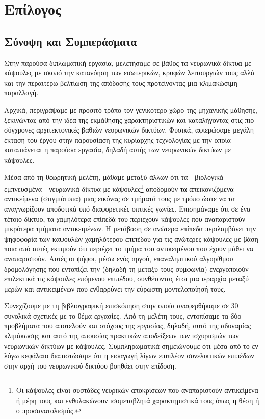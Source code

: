 \chapter{Επίλογος}

\section{Σύνοψη και Συμπεράσματα}

Στην παρούσα διπλωματική εργασία, μελετήσαμε σε βάθος τα νευρωνικά δίκτυα με κάψουλες με σκοπό την κατανόηση των εσωτερικών, κρυφών λειτουργιών τους αλλά και την περαιτέρω βελτίωση της απόδοσής τους προτείνοντας μια κλιμακώσιμη παραλλαγή.\par

Αρχικά, περιγράψαμε με προσιτό τρόπο τον γενικότερο χώρο της μηχανικής μάθησης, ξεκινώντας από την ιδέα της εκμάθησης χαρακτηριστικών και καταλήγοντας στις πιο σύγχρονες αρχιτεκτονικές βαθιών νευρωνικών δικτύων. Φυσικά, αφιερώσαμε μεγάλη έκταση του έργου στην παρουσίαση της κυρίαρχης τεχνολογίας με την οποία καταπιάνεται η παρούσα εργασία, δηλαδή αυτής των νευρωνικών δικτύων με κάψουλες.\par

Μέσα από τη θεωρητική μελέτη, μάθαμε μεταξύ άλλων ότι τα - βιολογικά εμπνευσμένα - νευρωνικά δίκτυα με κάψουλες\footnote{Οι κάψουλες είναι συστάδες νευρικών αποκρίσεων που αναπαριστούν αντικείμενα ή μέρη τους και ενθυλακώνουν ισομεταβλητά χαρακτηριστικά τους όπως η θέση ή ο προσανατολισμός.} αποδομούν τα απεικονιζόμενα αντικείμενα (στιγμιότυπα) μιας εικόνας σε τμήματά τους με τρόπο ώστε να τα αναγνωρίζουν αποδοτικά υπό διαφορετικές οπτικές γωνίες. Επισημάναμε ότι σε ένα τέτοιο δίκτυο, τα χαμηλότερα επίπεδά του περιέχουν κάψουλες που αναπαριστούν μικρότερα τμήματα αντικειμένων. Η μετάβαση σε ανώτερα επίπεδα περιλαμβάνει την ψηφοφορία των καψουλών χαμηλότερου επιπέδου για τις ανώτερες κάψουλες με βάση ποια από αυτές εκτιμούν ότι περιέχει το τμήμα του αντικειμένου που έχουν μάθει να αναπαριστούν. Αυτές οι ψήφοι, μέσω ενός αργού, επαναληπτικού αλγορίθμου δρομολόγησης που εντοπίζει την  (δηλαδή τη μεταξύ τους συμφωνία) ενεργοποιούν επιλεκτικά τις κάψουλες επόμενου επιπέδου, συνθέτοντας έτσι μια ιεραρχία μεταξύ μερών και αντικειμένων που ενθαρρύνει την εύρωστη μοντελοποίησή τους.\par

Συνεχίζουμε με τη βιβλιογραφική επισκόπηση στην οποία αναφερθήκαμε σε 30 συνολικά σχετικές με το θέμα εργασίες. Από τη μελέτη τους, εντοπίσαμε τα δύο προβλήματα που αποτελούν και στόχους της εργασίας, δηλαδή, αυτό της αδυναμίας κλιμάκωσης και αυτό της απουσίας πρακτικών αποδείξεων  των ισχυρισμών των νευρωνικών δικτύων με κάψουλες. Συμπληρωματικά σημειώνουμε ότι μέσα από το εν λόγω κεφάλαιο διαπιστώσαμε ότι η εισαγωγή λίγων επιπλέον συνελικτικών επιπέδων στην αρχή του νευρωνικού δικτύου βοηθάει στην επίδοση.\par

